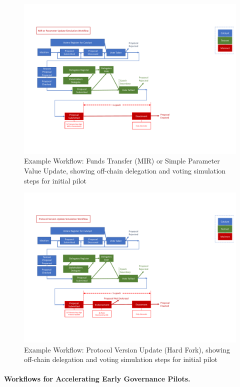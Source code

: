 \begin{figure}
  \includegraphics[trim=0 90 0 80,clip,width=\textwidth]{Workflow3}
  \caption{Example Workflow: Funds Transfer (MIR) or Simple Parameter Value Update, showing off-chain delegation and voting simulation steps for initial pilot}
  \label{fig:workflow-mir2}
\end{figure}

\begin{figure}
  \includegraphics[trim=0 90 0 80,clip,width=\textwidth]{Workflow4}
  \caption{Example Workflow: Protocol Version Update (Hard Fork), showing off-chain delegation and voting simulation steps for initial pilot}
  \label{fig:workflow-hf2}
\end{figure}

\paragraph{Workflows for Accelerating Early Governance Pilots.}


